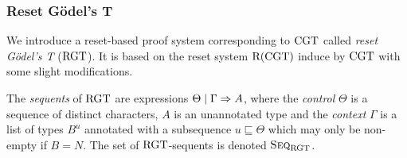 \subsubsection{Reset Gödel's T}
\label{sec:reset-godel}

We introduce a reset-based proof system corresponding to $\mathrm{CGT}$ called
\emph{reset Gödel's T} ($\mathrm{RGT}$). It is based on the reset system $\mathrm{R}(\mathrm{CGT})$
induce by $\mathrm{CGT}$ with some slight modifications.

The \emph{sequents} of $\mathrm{RGT}$ are expressions $\Theta \mid \Gamma \Rightarrow A$,
where the \emph{control} $\Theta$ is a sequence of distinct characters, $A$ is
an unannotated type and the \emph{context} $\Gamma$ is a list of types $B^u$
annotated with a subsequence $u \sqsubseteq \Theta$ which may only be non-empty
if $B = N$. The set of $\mathrm{RGT}$-sequents is denoted $\textsc{Seq}_{\mathrm{RGT}}$.

